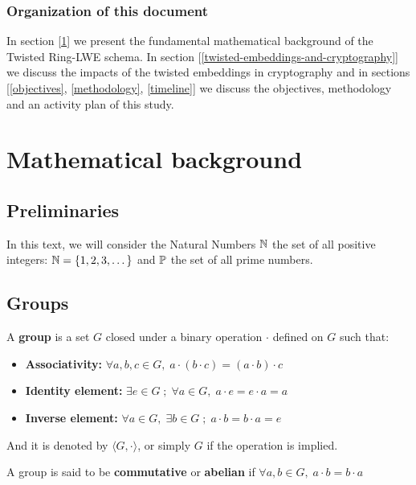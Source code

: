 \documentclass[a4paper,12pt]{article}
\begin{document}
\subsubsection*{Organization of this document}
\label{sec:org63df8dc}
In section [\ref{mathematical-background}] we present the fundamental mathematical background of the Twisted Ring-LWE schema. In section [\ref{twisted-embeddings-and-cryptography}] we discuss the impacts of the twisted embeddings in cryptography and in sections [\ref{objectives}, \ref{methodology}, \ref{timeline}] we discuss the objectives, methodology and an activity plan of this study.
\section{Mathematical background}
\label{mathematical-background}
\subsection{Preliminaries}
\label{sec:orgeb0998b}
In this text, we will consider the Natural Numbers \(\N\) the set of all positive integers: \(\N = \{1,2,3,\dots\}\) and \(\P\) the set of all prime numbers. 
\subsection{Groups}
\label{sec:org4d42c11}

\begin{definition}
  A \textbf{group} is a set $G$ closed under a binary operation $\cdot$ defined on $G$ such
  that:
  \begin{itemize}
  \item \textbf{Associativity: } $\forall a,b,c \in G, \; a\cdot(b\cdot c) = (a\cdot b)\cdot c$
  \item \textbf{Identity element: } $\exists e \in G \; ; \; \forall a \in G, \; a\cdot e = e\cdot a = a$
  \item \textbf{Inverse element: } $\forall a \in G, \; \exists b \in G \; ; \; a\cdot b = b \cdot a = e$
  \end{itemize}
And it is denoted by $\langle G,\cdot\rangle$, or simply $G$ if the operation is implied.
\end{definition}

\begin{definition}
  A group is said to be \textbf{commutative} or \textbf{abelian}
  if $\forall a, b \in G, \; a\cdot b = b\cdot a$
\end{definition}
\end{document}
